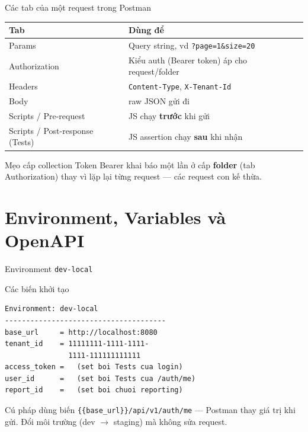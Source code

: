 \documentclass[aspectratio=169,12pt]{beamer}
\begin{document}
\begin{frame}{Các tab của một request trong Postman}
  \begin{center}
  \small
  \begin{tabular}{p{3.4cm}p{7.6cm}}
    \toprule
    \textbf{Tab} & \textbf{Dùng để} \\
    \midrule
    Params  & Query string, vd \texttt{?page=1\&size=20} \\
    Authorization & Kiểu auth (Bearer token) áp cho request/folder \\
    Headers & \texttt{Content-Type}, \texttt{X-Tenant-Id} \\
    Body    & raw JSON gửi đi \\
    Scripts / Pre-request & JS chạy \textbf{trước} khi gửi \\
    Scripts / Post-response (Tests) & JS assertion chạy \textbf{sau} khi nhận \\
    \bottomrule
  \end{tabular}
  \end{center}

  \begin{block}{Mẹo cấp collection}
    Token Bearer khai báo một lần ở cấp \textbf{folder}
    (tab Authorization) thay vì lặp lại từng request --- các request con
    kế thừa.
  \end{block}
\end{frame}

\section{Environment, Variables và OpenAPI}

\begin{frame}[fragile]{Environment \texttt{dev-local}}
  \begin{block}{Các biến khởi tạo}
\begin{lstlisting}[language={}]
Environment: dev-local
--------------------------------------
base_url     = http://localhost:8080
tenant_id    = 11111111-1111-1111-
               1111-111111111111
access_token =   (set boi Tests cua login)
user_id      =   (set boi Tests cua /auth/me)
report_id    =   (set boi chuoi reporting)
\end{lstlisting}
  \end{block}

  \begin{block}{Cú pháp dùng biến}
    \texttt{\{\{base\_url\}\}/api/v1/auth/me} --- Postman thay giá trị
    khi gửi. Đổi môi trường (dev $\to$ staging) mà không sửa request.
  \end{block}
\end{frame}
\end{document}

